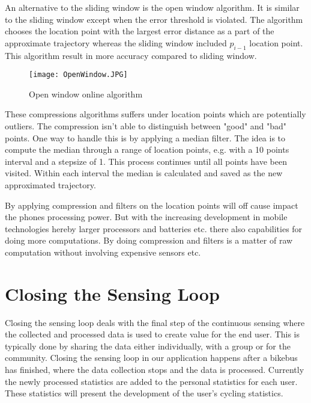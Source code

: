 An alternative to the sliding window is the open window algorithm. It is similar to the sliding window except when the error threshold is violated. The algorithm chooses the location point with the largest error distance as a part of the approximate trajectory whereas the sliding window included $p_{i-1}$ location point. This algorithm result in more accuracy compared to sliding window. 

\begin{figure}[H]
\centering
\texttt{[image: OpenWindow.JPG]}

\caption{Open window online algorithm}
\label{fig:open_window_algorithm}
\end{figure}

These compressions algorithms suffers under location points which are potentially outliers. The compression isn't able to distinguish between "good" and "bad" points. One way to handle this is by applying a median filter. The idea is to compute the median through a range of location points, e.g. with a 10 points interval and a stepsize of 1. This process continues until all points have been visited. Within each interval the median is calculated and saved as the new approximated trajectory.

By applying compression and filters on the location points will off cause impact the phones processing power. But with the increasing development in mobile technologies hereby larger processors and batteries etc. there also capabilities for doing more computations. By doing compression and filters is a matter of raw computation without involving expensive sensors etc.       
\iffalse
Suggestions for further processing:
\begin{itemize}
    \item Median filtering
    \item Advanced statistics calculations (analyse per interval)
    \item Algorithm to balance the trade-off between processing space and time (Appendix \ref{app:processing_algorithm})
\end{itemize}
\fi

\section{Closing the Sensing Loop}
Closing the sensing loop deals with the final step of the continuous sensing where the collected and processed data is used to create value for the end user.
This is typically done by sharing the data either individually, with a group or for the community. 
Closing the sensing loop in our application happens after a bikebus has finished, where the data collection stops and the data is processed. Currently the newly processed statistics are added to the personal statistics for each user. These statistics will present the development of the user's cycling statistics.

